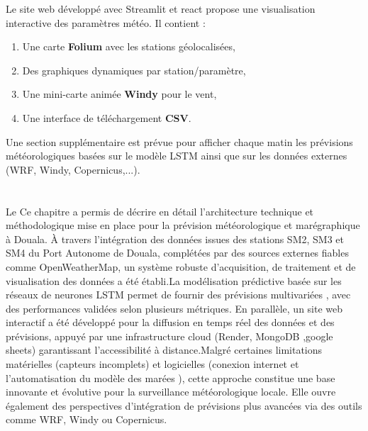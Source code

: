 \documentclass[a4paper,12pt,openany]{report}
\begin{document}
	\quad Le site web développé avec Streamlit et react propose une visualisation interactive des paramètres météo. Il contient :\\
	\begin{enumerate}
		\item Une carte \textbf{Folium} avec les stations géolocalisées,\\
		\item Des graphiques dynamiques par station/paramètre,\\
		\item Une mini-carte animée \textbf{Windy} pour le vent,\\
		\item Une interface de téléchargement \textbf{CSV}.
	\end{enumerate}
	Une section supplémentaire est prévue pour afficher chaque matin les prévisions météorologiques  basées sur le modèle LSTM ainsi que sur les données externes (WRF, Windy, Copernicus,...).
		
	
	\newpage
	\section*{}
	
	\quad Le Ce chapitre a permis de décrire en détail l’architecture technique et méthodologique mise en place pour la prévision météorologique et marégraphique à Douala. À travers l’intégration des données issues des stations SM2, SM3 et SM4 du Port Autonome de Douala, complétées par des sources externes fiables comme OpenWeatherMap, un système robuste d’acquisition, de traitement et de visualisation des données a été établi.La modélisation prédictive basée sur les réseaux de neurones LSTM permet de fournir des prévisions multivariées , avec des performances validées selon plusieurs métriques. En parallèle, un site web interactif a été développé pour la diffusion en temps réel des données et des prévisions, appuyé par une infrastructure cloud (Render, MongoDB ,google sheets) garantissant l’accessibilité à distance.Malgré certaines limitations matérielles (capteurs incomplets) et logicielles (conexion internet et l'automatisation du modèle des marées ), cette approche constitue une base innovante et évolutive pour la surveillance météorologique locale. Elle ouvre également des perspectives d’intégration de prévisions plus avancées via des outils comme WRF, Windy ou Copernicus.
	
\end{document}
